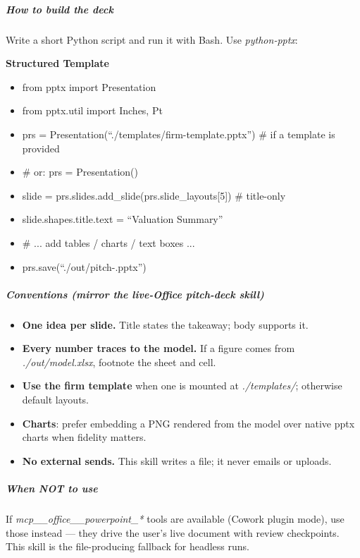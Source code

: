 \documentclass[11pt]{article}
\begin{document}
\subparagraph{How to build the deck}\mbox{}\par

Write a short Python script and run it with Bash. Use \emph{python-pptx}:


\textbf{Structured Template}
\begin{itemize}[leftmargin=*,itemsep=2pt,topsep=2pt]
\item {} from pptx import Presentation
\item {} from pptx.util import Inches, Pt
\item {} prs = Presentation(``./templates/firm-template.pptx'') \# if a template is provided
\item {} \# or: prs = Presentation()
\item {} slide = prs.slides.add\_\allowbreak{}slide(prs.slide\_\allowbreak{}layouts[5]) \# title-only
\item {} slide.shapes.title.text = ``Valuation Summary''
\item {} \# ... add tables / charts / text boxes ...
\item {} prs.save(``./out/pitch-.pptx'')
\end{itemize}

\subparagraph{Conventions (mirror the live-Office \emph{pitch-deck} skill)}\mbox{}\par

\begin{itemize}[leftmargin=*,itemsep=2pt,topsep=2pt]
\item {} \textbf{One idea per slide.} Title states the takeaway; body supports it.
\item {} \textbf{Every number traces to the model.} If a figure comes from \emph{./out/model.xlsx}, footnote the sheet and cell.
\item {} \textbf{Use the firm template} when one is mounted at \emph{./templates/}; otherwise default layouts.
\item {} \textbf{Charts}: prefer embedding a PNG rendered from the model over native pptx charts when fidelity matters.
\item {} \textbf{No external sends.} This skill writes a file; it never emails or uploads.
\end{itemize}

\subparagraph{When NOT to use}\mbox{}\par

If \emph{mcp\_\allowbreak{}\_\allowbreak{}office\_\allowbreak{}\_\allowbreak{}powerpoint\_\allowbreak{}*} tools are available (Cowork plugin mode), use those instead — they drive the user's live document with review checkpoints. This skill is the file-producing fallback for headless runs.
\end{document}
